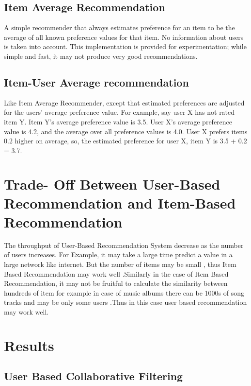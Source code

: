 \documentclass{article}
\begin{document}
\subsection{Item Average Recommendation}
A simple recommender that always estimates preference for an item to be the average of all known preference values for that item. No information about users is taken into account. This implementation is provided for experimentation; while simple and fast, it may not produce very good recommendations.

\subsection{Item-User Average recommendation}
Like Item Average Recommender, except that estimated preferences are adjusted for the users' average preference value. For example, say user X has not rated item Y. Item Y's average preference value is 3.5. User X's average preference value is 4.2, and the average over all preference values is 4.0. User X prefers items 0.2 higher on average, so, the estimated preference for user X, item Y is 3.5 + 0.2 = 3.7.


\section{Trade- Off Between User-Based Recommendation and Item-Based Recommendation}
The throughput of User-Based Recommendation System decrease as the number of users increases. For Example, it may take a large time predict a value in a large network like internet. But the number of items may be small , thus Item Based Recommendation may work well .Similarly in the case of Item Based Recommendation, it may not be fruitful to calculate the similarity between hundreds of item for example in case of music albums there can be 1000s of song tracks and may be only some users .Thus in this case user based recommendation may work well.


\section{Results}

\subsection{User Based Collaborative Filtering}
\end{document}
